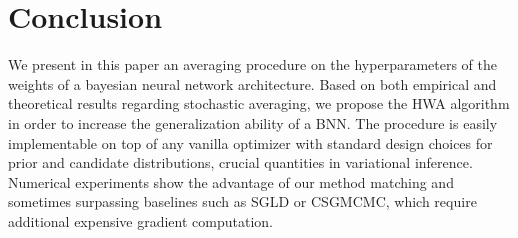 \documentclass[tablecaption=bottom,wcp]{jmlr}
\begin{document}
\section{Conclusion}\label{sec:conclusion}
We present in this paper an averaging procedure on the hyperparameters of the weights of a bayesian neural network architecture.
Based on both empirical and theoretical results regarding stochastic averaging, we propose the \textsc{HWA} algorithm in order to increase the generalization ability of a BNN.
The procedure is easily implementable on top of any vanilla optimizer with standard design choices for prior and candidate distributions, crucial quantities in variational inference.
Numerical experiments show the advantage of our method matching and sometimes surpassing baselines such as SGLD or CSGMCMC, which require additional expensive gradient computation.


\clearpage


\end{document}
